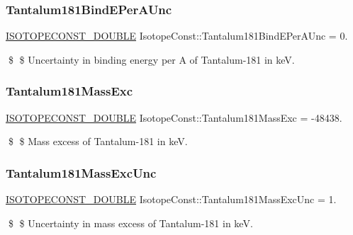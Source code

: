 \subsubsection{\texorpdfstring{Tantalum181\+Bind\+E\+Per\+A\+Unc}{Tantalum181BindEPerAUnc}}
{\footnotesize\ttfamily \mbox{\hyperlink{group___isotope_const-_macros_ga8f45a7272ce02c0b4c65c44636ed719a}{I\+S\+O\+T\+O\+P\+E\+C\+O\+N\+S\+T\+\_\+\+D\+O\+U\+B\+LE}} Isotope\+Const\+::\+Tantalum181\+Bind\+E\+Per\+A\+Unc = 0.}

\$ \$ Uncertainty in binding energy per A of Tantalum-\/181 in keV. \mbox{\label{group___isotope_const-_tantalum-_ta181_gae1c363d9fd5b6516c1a15520a26a6d9d}} 
\subsubsection{\texorpdfstring{Tantalum181\+Mass\+Exc}{Tantalum181MassExc}}
{\footnotesize\ttfamily \mbox{\hyperlink{group___isotope_const-_macros_ga8f45a7272ce02c0b4c65c44636ed719a}{I\+S\+O\+T\+O\+P\+E\+C\+O\+N\+S\+T\+\_\+\+D\+O\+U\+B\+LE}} Isotope\+Const\+::\+Tantalum181\+Mass\+Exc = -\/48438.}

\$ \$ Mass excess of Tantalum-\/181 in keV. \mbox{\label{group___isotope_const-_tantalum-_ta181_gab59359d8304c10020c2dc45fe3f522fa}} 
\subsubsection{\texorpdfstring{Tantalum181\+Mass\+Exc\+Unc}{Tantalum181MassExcUnc}}
{\footnotesize\ttfamily \mbox{\hyperlink{group___isotope_const-_macros_ga8f45a7272ce02c0b4c65c44636ed719a}{I\+S\+O\+T\+O\+P\+E\+C\+O\+N\+S\+T\+\_\+\+D\+O\+U\+B\+LE}} Isotope\+Const\+::\+Tantalum181\+Mass\+Exc\+Unc = 1.}

\$ \$ Uncertainty in mass excess of Tantalum-\/181 in keV. \mbox{\label{group___isotope_const-_tantalum-_ta181_ga42e4811a360e3d1e5b5613f8df68c957}} 
